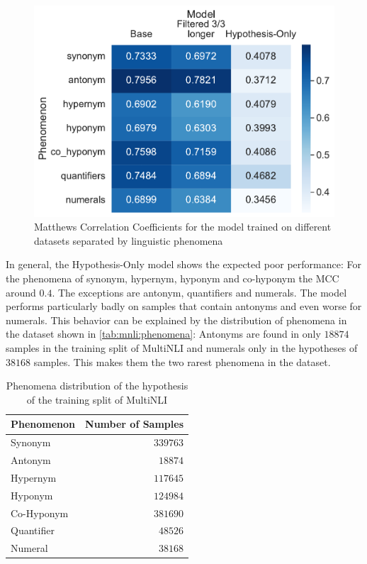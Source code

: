 \begin{figure}[h!]
    \centering
    \includegraphics[width=0.9\columnwidth]{./images/metric_heatmaps_phenomena/important_words/matthews_correlation.pdf}
    \caption{Matthews Correlation Coefficients for the model trained on different datasets separated by linguistic phenomena}
    \label{fig:metric-heatmap-phenomena-mcc}
\end{figure}

In general, the Hypothesis-Only model shows the expected poor performance: For the phenomena of synonym, hypernym, hyponym and co-hyponym the \ac{MCC} around $0.4$. The exceptions are antonym, quantifiers and numerals. The model performs particularly badly on samples that contain antonyms and even worse for numerals. This behavior can be explained by the distribution of phenomena in the dataset shown in \autoref{tab:mnli:phenomena}: Antonyms are found in only $18874$ samples in the training split of \ac{MultiNLI} and numerals only in the hypotheses of $38168$ samples. This makes them the two rarest phenomena in the dataset. 

\begin{table}[ht]
    \centering
    \caption{Phenomena distribution of the hypothesis of the training split of \ac{MultiNLI}}
    \small
    \begin{tabular}{l r}
        \toprule
        \multicolumn{1}{c}{Phenomenon} &  \multicolumn{1}{c}{Number of Samples} \\
        \midrule
        Synonym & $339763$ \\
        Antonym & $18874$ \\
        Hypernym & $117645$ \\
        Hyponym & $124984$ \\
        Co-Hyponym & $381690$ \\
        Quantifier & $48526$ \\
        Numeral & $38168$ \\
        \bottomrule
    \end{tabular}
    \label{tab:mnli:phenomena}
\end{table}

